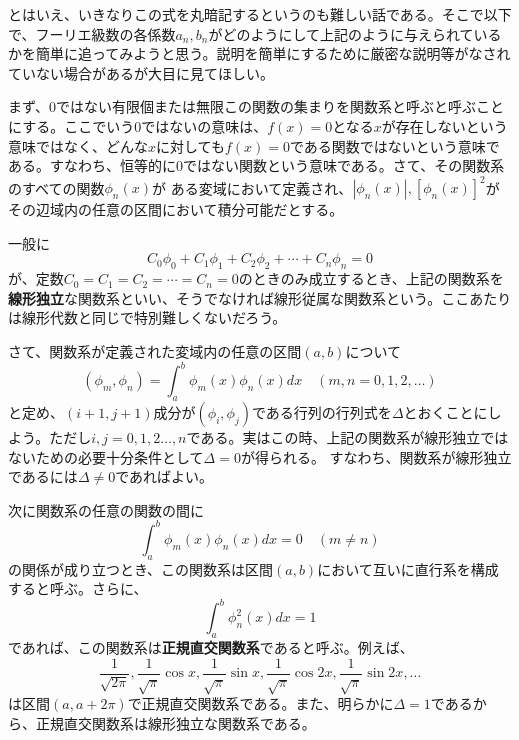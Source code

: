 \documentclass[a4j,dvipdfmx]{jsarticle}
\begin{document}
                とはいえ、いきなりこの式を丸暗記するというのも難しい話である。そこで以下で、フーリエ級数の各係数$a_n,b_n$がどのようにして上記のように与えられているかを簡単に追ってみようと思う。説明を簡単にするために厳密な説明等がなされていない場合があるが大目に見てほしい。

                まず、$0$ではない有限個または無限この関数の集まりを関数系と呼ぶと呼ぶことにする。ここでいう$0$ではないの意味は、$f(x)=0$となる$x$が存在しないという意味ではなく、どんな$x$に対しても$f(x)=0$である関数ではないという意味である。すなわち、恒等的に$0$ではない関数という意味である。さて、その関数系のすべての関数$\phi_n(x)$が
                ある変域において定義され、$|\phi_n(x)|,[\phi_n(x)]^2$がその辺域内の任意の区間において積分可能だとする。

                一般に
                \begin{equation*}
                    C_0\phi_0+C_1\phi_1+C_2\phi_2+\cdots+C_n\phi_n = 0
                \end{equation*}
                が、定数$C_0=C_1=C_2=\cdots=C_n=0$のときのみ成立するとき、上記の関数系を\textbf{線形独立}な関数系といい、そうでなければ線形従属な関数系という。ここあたりは線形代数と同じで特別難しくないだろう。

                さて、関数系が定義された変域内の任意の区間$(a,b)$について
                \begin{equation*}
                    (\phi_m,\phi_n)=\int_{a}^{b} \phi_m(x)\phi_n(x)dx \quad (m,n =0,1,2,\dots)
                \end{equation*}
                と定め、$(i+1,j+1)$成分が$(\phi_i,\phi_j)$である行列の行列式を$\Delta$とおくことにしよう。ただし$i,j=0,1,2\dots,n$である。実はこの時、上記の関数系が線形独立ではないための必要十分条件として$\Delta = 0$が得られる。
                すなわち、関数系が線形独立であるには$\Delta \neq 0$であればよい。

                次に関数系の任意の関数の間に
                \begin{equation*}
                    \int_{a}^{b}\phi_m(x)\phi_n(x)dx = 0 \quad (m\neq n)
                \end{equation*}
                の関係が成り立つとき、この関数系は区間$(a,b)$において互いに直行系を構成すると呼ぶ。さらに、
                \begin{equation*}
                    \int_{a}^{b}\phi_n^2(x)dx=1
                \end{equation*}
                であれば、この関数系は\textbf{正規直交関数系}であると呼ぶ。例えば、
                \begin{equation*}
                    \frac{1}{\sqrt{2\pi}},\frac{1}{\sqrt{\pi}}\cos x,\frac{1}{\sqrt{\pi}}\sin x,\frac{1}{\sqrt{\pi}}\cos 2x,\frac{1}{\sqrt{\pi}}\sin 2x,\dots
                \end{equation*}
                は区間$(a,a+2\pi)$で正規直交関数系である。また、明らかに$\Delta =1$であるから、正規直交関数系は線形独立な関数系である。
\end{document}
